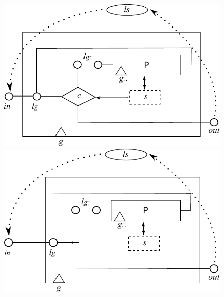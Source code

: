 \begin{figure}[h]%
  \centering
  \parbox{1.2in}{\includegraphics[scale=0.4]{images/iteration-actual}}%
  \qquad\qquad
  \begin{minipage}{1.2in}%
    \includegraphics[scale=0.4]{images/kleene-star-actual}
  \end{minipage}%
  \label{fig:new-and-split}%
\end{figure}

